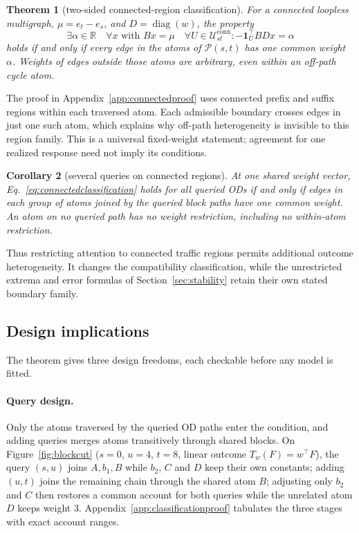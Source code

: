 \documentclass[a4paper,fleqn]{cas-sc}
\newtheorem{theorem}{Theorem}
\newtheorem{corollary}[theorem]{Corollary}
\newcommand{\R}{\mathbb{R}}
\begin{document}
\begin{theorem}[two-sided connected-region classification]\label{thm:connectedclassification}
For a connected loopless multigraph, $\mu=e_t-e_s$, and
$D=\operatorname{diag}(w)$, the property
\begin{equation}
\exists\alpha\in\R\quad\forall x\text{ with }Bx=\mu\quad
\forall U\in\mathcal U^{\mathrm{conn}}_{st}:
-\mathbf1_U^\top BDx=\alpha
\label{eq:connectedclassification}
\end{equation}
holds if and only if every edge in the atoms of $\mathcal P(s,t)$ has
one common weight $\alpha$. Weights of edges outside those atoms are
arbitrary, even within an off-path cycle atom.
\end{theorem}
The proof in Appendix~\ref{app:connectedproof} uses connected prefix and
suffix regions within each traversed atom. Each admissible boundary
crosses edges in just one such atom, which explains why off-path
heterogeneity is invisible to this region family. This is a universal
fixed-weight statement; agreement for one realized response need not
imply its conditions.

\begin{corollary}[several queries on connected regions]\label{cor:connectedmulti}
At one shared weight vector, Eq.~\eqref{eq:connectedclassification} holds
for all queried ODs if and only if edges in each group of atoms joined
by the queried block paths have one common weight. An atom on no queried
path has no weight restriction, including no within-atom restriction.
\end{corollary}
Thus restricting attention to connected traffic regions permits additional
outcome heterogeneity. It changes the compatibility classification,
while the unrestricted extrema and error formulas of
Section~\ref{sec:stability} retain their own stated boundary family.

\subsection{Design implications}\label{sec:design}
The theorem gives three design freedoms, each checkable before any model
is fitted.
\paragraph{Query design.}
Only the atoms traversed by the queried OD paths enter the condition, and
adding queries merges atoms transitively through shared blocks. On
Figure~\ref{fig:blockcut} ($s=0$, $u=4$, $t=8$, linear outcome
$T_w(F)=w^\top F$), the query $(s,u)$ joins $A,b_1,B$ while $b_2$, $C$
and $D$ keep their own constants; adding $(u,t)$ joins the remaining
chain through the shared atom $B$; adjusting only $b_2$ and $C$ then
restores a common account for both queries while the unrelated atom $D$
keeps weight $3$. Appendix~\ref{app:classificationproof} tabulates the
three stages with exact account ranges.

\end{document}
